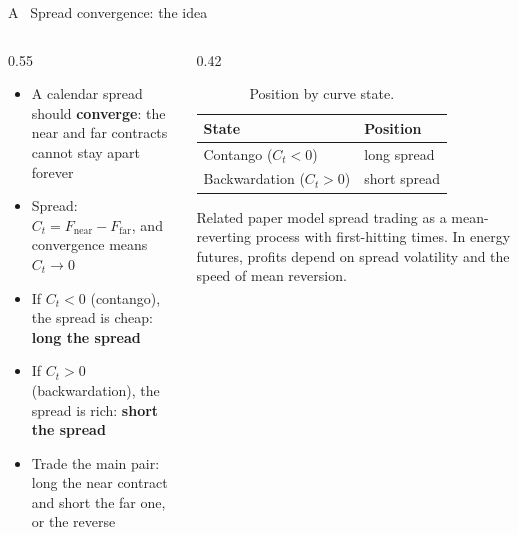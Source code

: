 \documentclass[10pt, aspectratio=169]{beamer}
\newcommand{\key}[1]{\textcolor{accent}{\textbf{#1}}}
\begin{document}
\begin{frame}{A \textperiodcentered\ Spread convergence: the idea}
\label{sl:a}
\begin{columns}[c, onlytextwidth]
\begin{column}{0.55\textwidth}
\footnotesize
\begin{itemize}
  \item A calendar spread should \key{converge}: the near and far contracts
        cannot stay apart forever
  \item Spread: $C_t = F_{\text{near}} - F_{\text{far}}$, and convergence means
        $C_t \rightarrow 0$
  \item If $C_t < 0$ (contango), the spread is cheap: \key{long the spread}
  \item If $C_t > 0$ (backwardation), the spread is rich: \key{short the spread}
  \item Trade the main pair: long the near contract and short the far one,
        or the reverse
\end{itemize}
\end{column}
\begin{column}{0.42\textwidth}
\begin{table}
\centering
\scriptsize
\setlength{\tabcolsep}{5pt}
\begin{tabular}{@{}l l@{}}
\toprule
State & Position \\
\midrule
Contango ($C_t<0$)      & long spread \\
Backwardation ($C_t>0$) & short spread \\
\bottomrule
\end{tabular}
\caption{Position by curve state.}
\end{table}
\vspace{0.5ex}
\begin{block}{Related paper}
{\scriptsize \textcite{kanamura2010profit} model spread trading as a
mean-reverting process with first-hitting times. In energy futures, profits
depend on spread volatility and the speed of mean reversion.}
\end{block}
\end{column}
\end{columns}
\end{frame}
\end{document}
